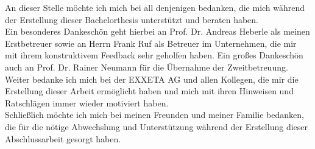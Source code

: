 \cleardoublepage

\vspace{1cm}
An dieser Stelle möchte ich mich bei all denjenigen bedanken, die mich während der Erstellung dieser Bachelorthesis unterstützt und beraten haben.\\

\noindent Ein besonderes Dankeschön geht hierbei an Prof. Dr. Andreas Heberle als meinen Erstbetreuer sowie an Herrn Frank Ruf als Betreuer im Unternehmen, die mir mit ihrem konstruktivem Feedback sehr geholfen haben. Ein großes Dankeschön auch an Prof. Dr. Rainer Neumann für die Übernahme der Zweitbetreuung. \\

\noindent Weiter bedanke ich mich bei der EXXETA AG und allen Kollegen, die mir die Erstellung dieser Arbeit ermöglicht haben und mich mit ihren Hinweisen und Ratschlägen immer wieder motiviert haben.\\

\noindent Schließlich möchte ich mich bei meinen Freunden und meiner Familie bedanken, die für die nötige Abwechslung und Unterstützung während der Erstellung dieser Abschlussarbeit gesorgt haben.


